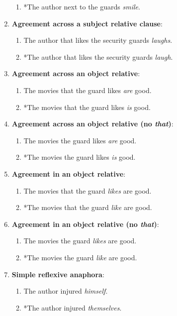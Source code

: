 \begin{enumerate}[noitemsep]
\begin{enumerate}
      \item *The author next to the guards \textit{smile}.
    \end{enumerate}
  \item \textbf{Agreement across a subject relative clause}:
    \begin{enumerate}
      \item The author that likes the security guards \textit{laughs}.
      \item *The author that likes the security guards \textit{laugh}.
    \end{enumerate}
  \item \textbf{Agreement across an object relative}:
    \begin{enumerate}
      \item The movies that the guard likes \textit{are} good.
      \item *The movies that the guard likes \textit{is} good.
    \end{enumerate}
  \item \textbf{Agreement across an object relative (no \textit{that})}:
    \begin{enumerate}
      \item The movies the guard likes \textit{are} good.
      \item *The movies the guard likes \textit{is} good.
    \end{enumerate}
  \item \textbf{Agreement in an object relative}:
    \begin{enumerate}
      \item The movies that the guard \textit{likes} are good.
      \item *The movies that the guard \textit{like} are good.
    \end{enumerate}
  \item \textbf{Agreement in an object relative (no \textit{that})}:
    \begin{enumerate}
      \item The movies the guard \textit{likes} are good.
      \item *The movies the guard \textit{like} are good.
    \end{enumerate}
  \item \textbf{Simple reflexive anaphora}:
    \begin{enumerate}
      \item The author injured \textit{himself}.
      \item *The author injured \textit{themselves}.

\end{enumerate}
\end{enumerate}
